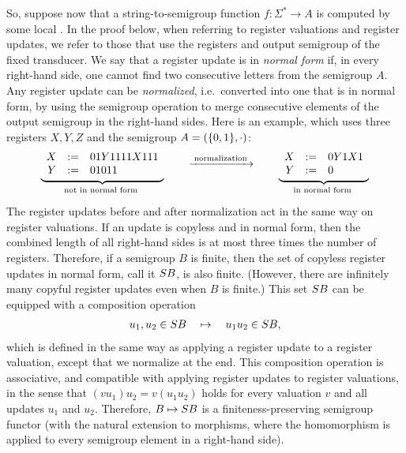 So, suppose now that a string-to-semigroup function $f\colon \Sigma^* \to A$ is
computed by some local \sst. In the proof below, when referring to register valuations and register updates, we refer to those that use the registers and output semigroup of the fixed transducer. We say that a register update is in \emph{normal form} if, in every right-hand side, one cannot find two consecutive letters from the semigroup $A$.
Any register update can be \emph{normalized}, i.e.~converted into one that is in normal form, by using the semigroup operation to merge consecutive elements of the output semigroup in the right-hand sides.
Here is an example, which uses three registers $X,Y,Z$ and the semigroup $A = (\{0,1\}, \cdot)$:
\begin{align*}
  \myunderbrace{
  \begin{array}{rcl}
    X &:=& 01Y1111X111\\
    Y &:=& 01011
  \end{array}
  }{not in normal form}
  \qquad \xrightarrow{\;\text{normalization}\;} \qquad
  \myunderbrace{
  \begin{array}{rcl}
    X &:=& 0Y1X1\\
    Y &:=& 0
  \end{array}
  }{in normal form}
\end{align*}
The register updates before and after normalization act in the same way on
register valuations. If an update is copyless and in normal form, then the
combined length of all right-hand sides is at most three times the number of
registers. Therefore, if a semigroup $B$ is finite, then the set of copyless
register updates in normal form, call it $\functors B$, is also finite.
(However, there are infinitely many copyful register updates even when $B$ is
finite.) This set $\functors B$ can be equipped with a composition operation
\begin{align*}
    u_1,u_2 \in \functors B  \quad \mapsto \quad u_1u_2 \in \functors B,
\end{align*}
which is defined in the same way as applying a register update to a register
valuation, except that we normalize at the end. This composition operation is
associative, and  compatible with applying register updates to register
valuations, in the sense that $(vu_1)u_2 = v(u_1u_2)$ holds for every valuation
$v$ and all updates $u_1$ and $u_2$. Therefore, $B \mapsto \functors B$ is a finiteness-preserving semigroup functor (with the natural extension to morphisms, where the homomorphism is applied to every semigroup element in a right-hand side). 

